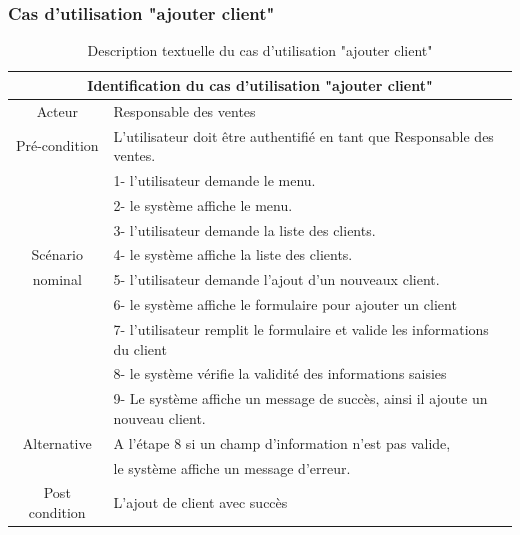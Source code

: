\documentclass[edit,12pt,a4paper,ChapStyle,oneside,doubleinterligne]{report}
\begin{document}
\subsubsection{Cas d'utilisation "ajouter client"}
\begin{table}[h!]
    \centering
\begin{tabular}{|c|m{10cm}|}
    \hline
         \multicolumn{2}{|c|}{Identification du cas d'utilisation "ajouter client" }\\
         \hline
         Acteur & Responsable des ventes\\
         \hline
         Pré-condition & L'utilisateur doit être authentifié en tant que Responsable des ventes. \\
         \hline
          & 1- l'utilisateur demande le menu.\\
          & 2- le système affiche le menu. \\
          & 3- l'utilisateur demande la liste des clients.\\
          Scénario & 4- le système affiche la liste des clients. \\          
          nominal& 5- l'utilisateur demande l’ajout d’un nouveaux client.\\
          & 6- le système affiche le formulaire pour ajouter un client \\
          & 7- l'utilisateur remplit le formulaire et valide les informations du client \\
          & 8- le système vérifie la validité des informations saisies\\
          & 9- Le système affiche un message de succès, ainsi il ajoute un nouveau client.\\
         \hline
         Alternative  & A l’étape 8 si un champ d’information n’est pas valide,  \\
         & le système affiche un message d’erreur.\\
         \hline
         Post condition& L’ajout de client avec succès \\
         \hline
    \end{tabular}
\caption{Description textuelle du cas d'utilisation "ajouter client"}
\label{tab:aj}
\end{table}
\end{document}
